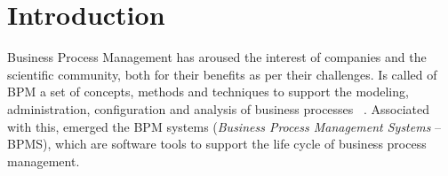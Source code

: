 \documentclass[runningheads,a4paper]{llncs}
\begin{document}
\section{Introduction}


Business Process Management has aroused the interest of companies and the scientific community, both for their benefits as per their challenges. Is called of BPM a set of concepts, methods and techniques to support the modeling, administration, configuration and analysis of business processes  ~\cite{weske}. Associated with this, emerged the BPM systems (\emph{Business Process Management Systems} -- BPMS), which are software tools to support the life cycle of business process management.

\end{document}
